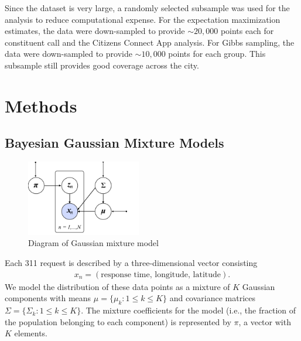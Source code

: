 \documentclass[twoside]{article}
\theoremstyle{theorem}
\theoremstyle{theorem}
\theoremstyle{theorem}
\theoremstyle{lemma}
\theoremstyle{definition}
\theoremstyle{example}
\begin{document}
Since the dataset is very large, a randomly selected subsample was used for the analysis to reduce computational expense. For the expectation maximization estimates, the data were down-sampled to provide $\sim20,000$ points each for constituent call and the Citizens Connect App analysis. For Gibbs sampling, the data were down-sampled to provide $\sim10,000$ points for each group. This subsample still provides good coverage across the city. 
\section{Methods}
\subsection{Bayesian Gaussian Mixture Models}
\begin{figure}
\begin{center}
\includegraphics[width=50mm]{graph_model}
\caption{Diagram of Gaussian mixture model}
\end{center}
\end{figure}
Each 311 request is described by a three-dimensional vector consisting 
\begin{align}
x_n = (\text{response time, longitude, latitude}). 
\end{align}
We model the distribution of these data points as a mixture of $K$ Gaussian components with means $\mu = \{\mu_k :  1\leq k\leq K\}$ and covariance matrices $\Sigma = \{\Sigma_k :  1\leq k\leq K\}$. The mixture coefficients for the model (i.e., the fraction of the population belonging to each component) is represented by $\pi$, a vector with $K$ elements.  
\end{document}

